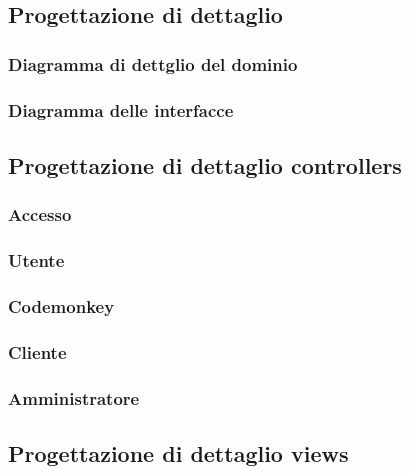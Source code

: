 \documentclass{article}
\begin{document}
\subsection{Progettazione di dettaglio}
\subsubsection{Diagramma di dettglio del dominio}

\subsubsection{Diagramma delle interfacce}


\subsection{Progettazione di dettaglio controllers}
\subsubsection{Accesso}

\subsubsection{Utente}

\subsubsection{Codemonkey}

\subsubsection{Cliente}

\subsubsection{Amministratore}


\subsection{Progettazione di dettaglio views}
\end{document}
